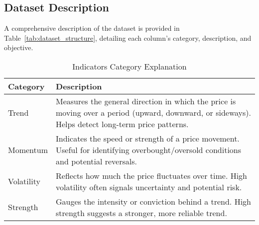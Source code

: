 \clearpage
\subsection{Dataset Description}
\label{app:dataset}

A comprehensive description of the dataset is provided in Table~\ref{tab:dataset_structure}, detailing each column's category, description, and objective.

\begin{table}[H]
\centering
\label{tab:indicators}
\caption{Indicators Category Explanation}
\begin{tabular}{lp{12.3cm}}
\hline \textbf{Category} & \textbf{Description} \\ \hline\hline
Trend & 
Measures the general direction in which the price is moving over a period (upward, downward, or 
sideways). Helps detect long-term price patterns. \\
Momentum & Indicates the speed or strength of a price movement. Useful for identifying 
overbought/oversold conditions and potential reversals. \\
Volatility & Reflects how much the price fluctuates over time. High volatility often signals 
uncertainty and potential risk. \\
Strength & Gauges the intensity or conviction behind a trend. High strength suggests a
stronger, more reliable trend. \\
\hline
\end{tabular}
\end{table}

